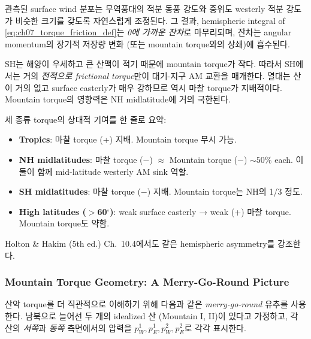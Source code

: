 \begin{theorem}\label{thm:ch07_torque_friction_balance}
관측된 surface wind 분포는 무역풍대의 적분 동풍 강도와 중위도 westerly
적분 강도가 비슷한 크기를 갖도록 자연스럽게 조정된다.  그 결과,
hemispheric integral of \eqref{eq:ch07_torque_friction_def}는
\textit{0에 가까운 잔차}로 마무리되며, 잔차는 angular momentum의 장기적
저장량 변화 (또는 mountain torque와의 상쇄)에 흡수된다.
\end{theorem}


\begin{remark}
SH는 해양이 우세하고 큰 산맥이 적기 때문에 mountain torque가 작다.
따라서 SH에서는 거의 \textit{전적으로 frictional torque}만이 대기-지구 AM
교환을 매개한다.  열대는 산이 거의 없고 surface easterly가 매우 강하므로
역시 마찰 torque가 지배적이다.  Mountain torque의 영향력은 NH midlatitude에
거의 국한된다.
\end{remark}

\begin{hisublock}
세 종류 torque의 상대적 기여를 한 줄로 요약:
\begin{itemize}
  \item \textbf{Tropics}: 마찰 torque (+) 지배. Mountain torque 무시 가능.
  \item \textbf{NH midlatitudes}: 마찰 torque ($-$) $\approx$ Mountain torque ($-$)
    $\sim 50\%$ each. 이 둘이 함께 mid-latitude westerly AM sink 역할.
  \item \textbf{SH midlatitudes}: 마찰 torque ($-$) 지배. Mountain torque는
    NH의 1/3 정도.
  \item \textbf{High latitudes ($>$60$^\circ$)}: weak surface easterly →
    weak (+) 마찰 torque. Mountain torque도 약함.
\end{itemize}
Holton \& Hakim (5th ed.) Ch.~10.4에서도 같은 hemispheric asymmetry를
강조한다.
\end{hisublock}

\subsubsection{Mountain Torque Geometry: A Merry-Go-Round Picture}

산악 torque를 더 직관적으로 이해하기 위해 다음과 같은 \textit{merry-go-round}
유추를 사용한다.  남북으로 늘어선 두 개의 idealized 산 (Mountain I, II)이
있다고 가정하고, 각 산의 \textit{서쪽}과 \textit{동쪽} 측면에서의 압력을
$p_W^1, p_E^1, p_W^2, p_E^2$로 각각 표시한다.

